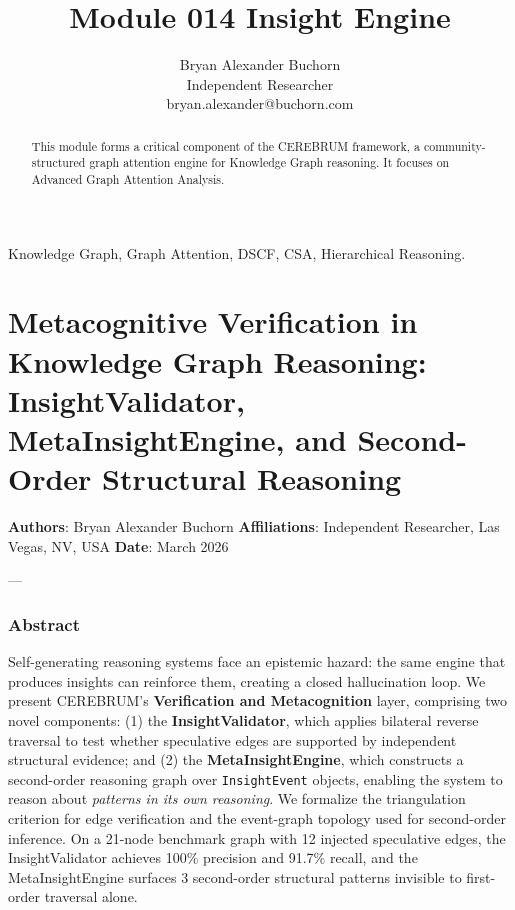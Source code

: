 \documentclass[10pt,journal,compsoc]{IEEEtran}
\begin{document}
\title{Module 014 Insight Engine}
\author{Bryan Alexander Buchorn \\ Independent Researcher \\ bryan.alexander@buchorn.com}

\maketitle

\begin{abstract}
This module forms a critical component of the CEREBRUM framework, a community-structured graph attention engine for Knowledge Graph reasoning. It focuses on Advanced Graph Attention Analysis.
\end{abstract}

\begin{IEEEkeywords}
Knowledge Graph, Graph Attention, DSCF, CSA, Hierarchical Reasoning.
\end{IEEEkeywords}

\section{Metaco\-gnitive Verifi\-cation in Knowledge Graph Reasoning: InsightValidator, MetaInsightEngine, and Second-Order Structural Reasoning}

\textbf{Authors}: Bryan Alexander Buchorn
\textbf{Affili\-ations}: Independent Researcher, Las Vegas, NV, USA
\textbf{Date}: March 2026

---

\subsubsection{Abstract}
Self-generating reasoning systems face an epistemic hazard: the same engine that produces insights can reinforce them, creating a closed hallu\-cination loop. We present CEREBRUM's \textbf{Verifi\-cation and Metaco\-gnition} layer, comprising two novel components: (1) the \textbf{InsightValidator}, which applies bilateral reverse traversal to test whether speculative edges are supported by independent structural evidence; and (2) the \textbf{MetaInsightEngine}, which constructs a second-order reasoning graph over \texttt{InsightEvent} objects, enabling the system to reason about \textit{patterns in its own reasoning}. We formalize the trian\-gulation criterion for edge verif\-ication and the event-graph topology used for second-order inference. On a 21-node benchmark graph with 12 injected speculative edges, the InsightValidator achieves 100\% precision and 91.7\% recall, and the MetaInsightEngine surfaces 3 second-order structural patterns invisible to first-order traversal alone.
\end{document}
